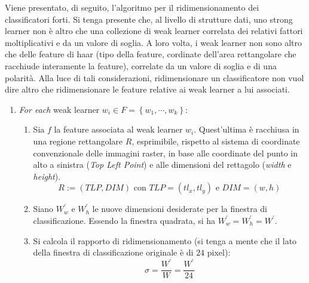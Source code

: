         Viene presentato, di seguito, l'algoritmo per il ridimensionamento dei classificatori forti. 
        Si tenga presente che, al livello di strutture dati, uno strong learner non è altro che una collezione di weak learner correlata dei relativi fattori moltiplicativi e da un valore di soglia.
        A loro volta, i weak learner non sono altro che delle feature di haar (tipo della feature, cordinate dell'area rettangolare che racchiude interamente la feature), correlate da un valore di soglia e di una polarità.
        Alla luce di tali considerazioni, ridimensionare un classificatore non vuol dire altro che ridimensionare le feature relative ai weak learner a lui associati.

        \begin{enumerate}
            \item \emph{For each} weak learner $w_i \in F = \left\{w_1, \cdots, w_k\right\}$: 
            \begin{enumerate}
                \item Sia $f$ la feature associata al weak learner $w_i$.
                Quest'ultima è racchiusa in una regione rettangolare $R$, esprimibile, rispetto al sistema di coordinate convenzionale delle immagini raster, in base alle coordinate del punto in alto a sinistra (\emph{Top Left Point}) e alle dimensioni del rettagolo (\emph{width} e \emph{height}).
                \begin{equation}
                    \label{subeq:rectangular_region}
                    R := (TLP, DIM) \text{ con } TLP = (tl_x, tl_y) \text{ e } DIM = (w, h)
                \end{equation}

                \item Siano ${W}^{'}_{w}$ e ${W}^{'}_{h}$ le nuove dimensioni desiderate per la finestra di classificazione.
                Essendo la finestra quadrata, si ha ${W}^{'}_{w} = {W}^{'}_{h} = W^{'}$.

                \item Si calcola il rapporto di ridimensionamento (si tenga a mente che il lato della finestra di classificazione originale è di $24$ pixel):
                \begin{equation}
                    \label{subeq:scale_ratio}
                    \sigma = \frac{W^{'}}{W} = \frac{W^{'}}{24}
                \end{equation}


\end{enumerate}
\end{enumerate}
